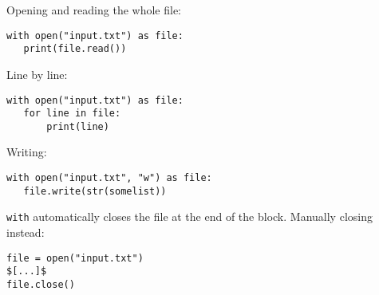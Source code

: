 \documentclass[12pt,twocolumn]{article}
\begin{document}
	Opening and reading the whole file:
	\begin{lstlisting}
with open("input.txt") as file:
   print(file.read())\end{lstlisting}
   
   Line by line:
   \begin{lstlisting}
with open("input.txt") as file:
   for line in file:
       print(line)\end{lstlisting}
       
   Writing:
   \begin{lstlisting}
with open("input.txt", "w") as file:
   file.write(str(somelist))\end{lstlisting}
        
   \lstinline|with| automatically closes the file at the end of the block. Manually closing instead:
   
   \begin{lstlisting}
file = open("input.txt")
$[...]$
file.close()\end{lstlisting}
\end{document}
